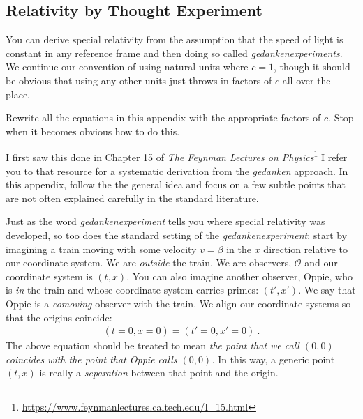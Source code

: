 \documentclass[12pt, oneside]{report}    %
\let\oldsection\section
\def\section{%
  \setcounter{sidenote}{1}%
  \oldsection
}
\begin{document}
\begin{subappendices}

\section{Relativity by Thought Experiment}\label{sec:subappendix:relativity}
You can derive special relativity from the assumption that the speed of light is constant in any reference frame and then doing so called \emph{gedankenexperiments}. We continue our convention of using natural units where $c=1$, though it should be obvious that using any other units just throws in factors of $c$ all over the place.
\begin{exercise}
Rewrite all the equations in this appendix with the appropriate factors of $c$. Stop when it becomes obvious how to do this. 
\end{exercise}
I first saw this done in Chapter 15 of \emph{The Feynman Lectures on Physics}\footnote{\url{https://www.feynmanlectures.caltech.edu/I_15.html}} I refer you to that resource for a systematic derivation from the \emph{gedanken} approach. In this appendix, follow the the general idea and focus on a few subtle points that are not often explained carefully in the standard literature.

Just as the word \emph{gedankenexperiment} tells you where special relativity was developed, so too does the standard setting of the \emph{gedankenexperiment}: start by imagining a train moving with some velocity $v=\beta$ in the $x$ direction relative to our coordinate system. We are \emph{outside} the train. We are observers, $\mathcal O$ and our coordinate system is $(t,x)$. You can also imagine another observer, Oppie, who is \emph{in} the train and whose coordinate system carries primes: $(t',x')$. We say that Oppie is a \emph{comoving} observer with the train. We align our coordinate systems so that the origins coincide: 
\begin{align}
    (t=0,x=0) = (t'=0,x'=0) \ .
\end{align}
The above equation should be treated to mean \emph{the point that we call $(0,0)$ coincides with the point that Oppie calls $(0,0)$.} In this way, a generic point $(t,x)$ is really a \emph{separation} between that point and the origin.



\end{subappendices}
\end{document}

